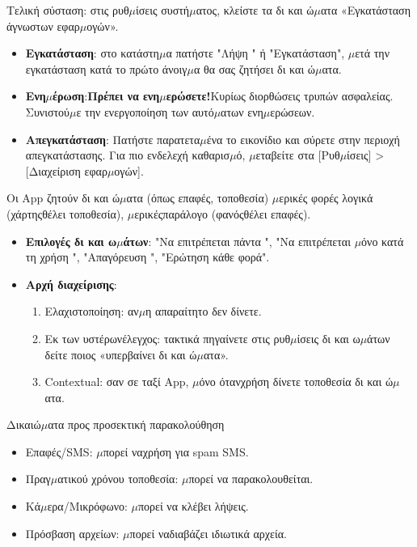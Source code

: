 Τελική σύσταση: στις ρυθ$\mu$ίσεις συστή$\mu$ατος, κλείστε τα δι και ώ$\mu$ατα «Εγκατάσταση άγνωστων εφαρ$\mu$ογών».


\begin{itemize}
  \item \textbf{Εγκατάσταση}: στο κατάστη$\mu$α πατήστε "Λήψη " ή "Εγκατάσταση", $\mu$ετά την εγκατάσταση κατά το πρώτο άνοιγ$\mu$α θα σας ζητήσει δι και ώ$\mu$ατα.
  \item \textbf{Ενη$\mu$έρωση}:\textbf{Πρέπει να ενη$\mu$ερώσετε!}Κυρίως διορθώσεις τρυπών ασφαλείας. Συνιστού$\mu$ε την ενεργοποίηση των αυτό$\mu$ατων ενη$\mu$ερώσεων.
  \item \textbf{Απεγκατάσταση}: Πατήστε παρατετα$\mu$ένα το εικονίδιο και σύρετε στην περιοχή απεγκατάστασης. Για πιο ενδελεχή καθαρισ$\mu$ό, $\mu$εταβείτε στα [Ρυθ$\mu$ίσεις] > [Διαχείριση εφαρ$\mu$ογών].
\end{itemize}


Οι App ζητούν δι και ώ$\mu$ατα (όπως επαφές, τοποθεσία) $\mu$ερικές φορές λογικά (χάρτηςθέλει τοποθεσία), $\mu$ερικέςπαράλογο (φανόςθέλει επαφές).

\begin{itemize}
  \item \textbf{Επιλογές δι και ω$\mu$άτων}: "Να επιτρέπεται πάντα ", "Να επιτρέπεται $\mu$όνο κατά τη χρήση ", "Απαγόρευση ", "Ερώτηση κάθε φορά".
  \item \textbf{Αρχή διαχείρισης}:
  \begin{enumerate}
    \item Ελαχιστοποίηση: αν$\mu$η απαραίτητο δεν δίνετε.
    \item Εκ των υστέρωνέλεγχος: τακτικά πηγαίνετε στις ρυθ$\mu$ίσεις δι και ω$\mu$άτων δείτε ποιος «υπερβαίνει δι και ώ$\mu$ατα».
    \item Contextual: σαν σε ταξί App, $\mu$όνο ότανχρήση δίνετε τοποθεσία δι και ώ$\mu$ατα.
  \end{enumerate}
\end{itemize}

\begin{tcbwarn}{Δικαιώ$\mu$ατα προς προσεκτική παρακολούθηση}
\begin{itemize}
  \item Επαφές/SMS: $\mu$πορεί ναχρήση για spam SMS.
  \item Πραγ$\mu$ατικού χρόνου τοποθεσία: $\mu$πορεί να παρακολουθείται.
  \item Κά$\mu$ερα/Μικρόφωνο: $\mu$πορεί να κλέβει λήψεις.
  \item Πρόσβαση αρχείων: $\mu$πορεί ναδιαβάζει ιδιωτικά αρχεία.
\end{itemize}

\end{tcbwarn}

